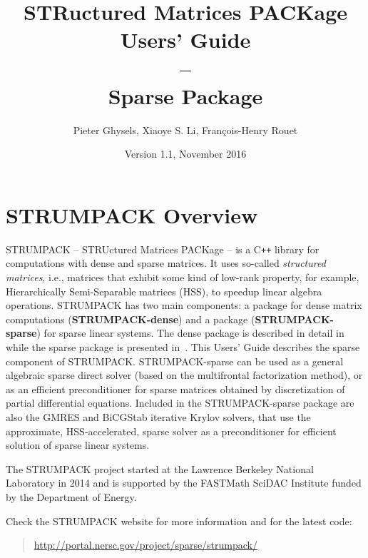 \documentclass{article}
\title{\vspace{-3\baselineskip}STRuctured Matrices PACKage Users' Guide\\
--\\
Sparse Package}
\author{Pieter Ghysels\footnotemark[1] , Xiaoye S. Li\footnotemark[1] , Fran\c{c}ois-Henry Rouet\footnotemark[1]}
\date{Version 1.1, November 2016}
\begin{document}
\maketitle

\vfill

\tableofcontents


\pagebreak
\section{STRUMPACK Overview}
STRUMPACK -- STRUctured Matrices PACKage -- is a C\texttt{++} library
for computations with dense and sparse matrices. It uses so-called
\emph{structured matrices}, i.e., matrices that exhibit some kind of
low-rank property, for example, Hierarchically Semi-Separable
matrices (HSS), to speedup linear algebra operations. STRUMPACK has
two main components: a package for dense matrix computations
(\textbf{STRUMPACK-dense}) and a package (\textbf{STRUMPACK-sparse})
for sparse linear systems. The dense package is described in detail
in~\cite{rouet2014distributed} while the sparse package is presented
in~\cite{ghysels2015sparse}. This Users' Guide describes the sparse
component of STRUMPACK. STRUMPACK-sparse can be used as a general
algebraic sparse direct solver (based on the multifrontal
factorization method), or as an efficient preconditioner for sparse
matrices obtained by discretization of partial differential
equations. Included in the STRUMPACK-sparse package are also the GMRES
and BiCGStab iterative Krylov solvers, that use the approximate,
HSS-accelerated, sparse solver as a preconditioner for efficient
solution of sparse linear systems.

The STRUMPACK project started at the Lawrence Berkeley National
Laboratory in 2014 and is supported by the FASTMath SciDAC Institute
funded by the Department of Energy.

\noindent Check the STRUMPACK website for more information and for the
latest code:
\begin{quote}
  \url{http://portal.nersc.gov/project/sparse/strumpack/}
\end{quote}
\end{document}
